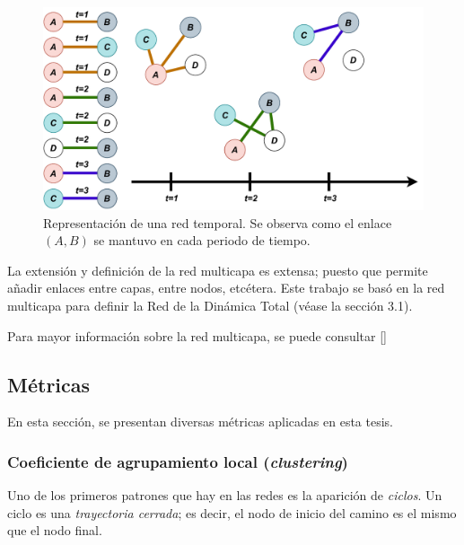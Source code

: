 \documentclass[../main.tex]{subfiles}
\begin{document}
\begin{figure}[h!]
    \centering
    \includegraphics[scale = 0.6]{images/marcoteorico_redtemporal.drawio.pdf}
    \caption{Representación de una red temporal. Se observa como el enlace $(A,B)$ se mantuvo en cada periodo de tiempo. }
    \label{fig:marcoteorico_redtemporal}
\end{figure}

La extensión y definición de la red multicapa es extensa; puesto que permite añadir enlaces entre capas, entre nodos, etcétera. Este trabajo se basó en la red multicapa para definir la Red de la Dinámica Total (véase la sección 3.1).

Para mayor información sobre la red multicapa, se puede consultar [\cite{10.1093/comnet/cnu016}]

\subsection{ Métricas}


En esta sección, se presentan diversas métricas aplicadas en esta tesis. 




\subsubsection{Coeficiente de agrupamiento local (\textit{clustering}) }

Uno de los primeros patrones que hay en las redes es la aparición de \textit{ciclos}. Un ciclo es una \textit{trayectoria cerrada}; es decir, el nodo de inicio del camino es el mismo que el nodo final. 
\end{document}
